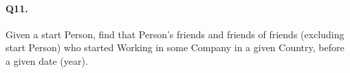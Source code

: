 \paragraph{Q11.}

Given a start Person, find that Person's friends and friends of friends
(excluding start Person) who started Working in some Company in a given
Country, before a given date (year).
